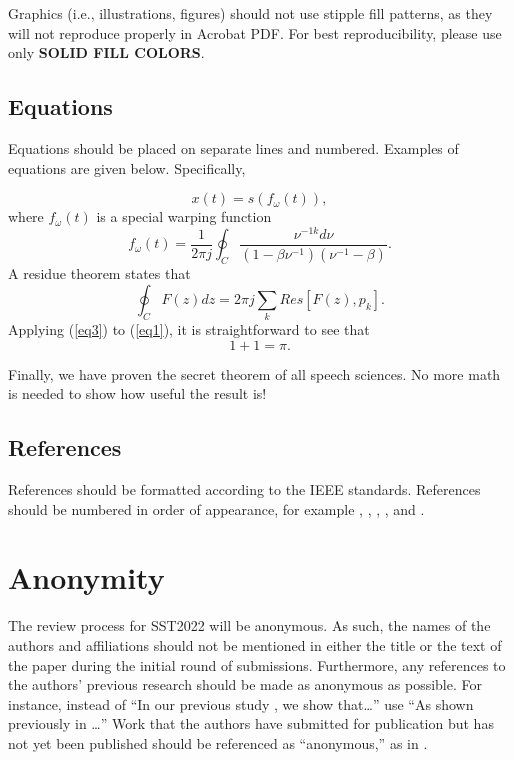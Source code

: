 \documentclass[a4paper]{article}
\begin{document}
Graphics (i.e., illustrations, figures) should not use stipple fill patterns, as they will not reproduce properly in Acrobat PDF. For best reproducibility, please use only \textbf{SOLID FILL COLORS}. 



\subsection{Equations}

Equations should be placed on separate lines and numbered. Examples
of equations are given below.
Specifically,

\begin{equation}
x(t) = s(f_\omega(t)),
\label{eq1}
\end{equation}
where \(f_\omega(t)\) is a special warping function
\begin{equation}
f_\omega(t)=\frac{1}{2\pi j}\oint_C \frac{\nu^{-1k}d\nu}
{(1-\beta\nu^{-1})(\nu^{-1}-\beta)}.
\label{eq2}
\end{equation}
A residue theorem states that
\begin{equation}
\oint_C F(z)dz=2 \pi j \sum_k Res[F(z),p_k].
\label{eq3}
\end{equation}
Applying (\ref{eq3}) to (\ref{eq1}),
it is straightforward to see that
\begin{equation}
1 + 1 = \pi.
\label{eq4}
\end{equation}

Finally, we have proven the secret theorem of all speech sciences.
No more math is needed to show how useful the result is!

\subsection{References}

References should be formatted according to the IEEE standards.
References should be numbered in order of appearance,
for example \cite{ES1}, \cite{ES2}, \cite{ES3},  \cite{ES4}, and \cite{ES5}.

\section{Anonymity}

The review process for SST2022 will be anonymous. As such, the names of the authors and affiliations should not be mentioned in either the title or the text of the paper during the initial round of submissions. Furthermore, any references to the authors' previous research should be made as anonymous as possible.  For instance, instead of ``In our previous study \cite{ES2}, we show that\ldots'' use ``As shown previously in \cite{ES2}\ldots''
Work that the authors have submitted for publication but has not yet been published should be referenced as ``anonymous,'' as in \cite{ES5}.
\end{document}

